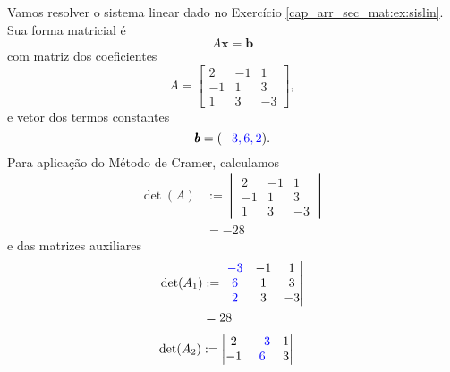 \begin{ex}
  Vamos resolver o sistema linear dado no Exercício \ref{cap_arr_sec_mat:ex:sislin}. Sua forma matricial é
  \begin{equation}
    A\pmb{x} = \pmb{b}
  \end{equation}
  com matriz dos coeficientes
  \begin{equation}
        A =
    \begin{bmatrix}
      2 & -1 & 1\\
      -1 & 1 & 3\\
      1 & 3 & -3
    \end{bmatrix},
  \end{equation}
  e vetor dos termos constantes
  \begin{equation}
    \pmb{b} = ({\color{blue}-3, 6, 2}).
  \end{equation}
  Para aplicação do Método de Cramer, calculamos
  \begin{subequations}
    \begin{align}
      \det(A) &:=
                \begin{vmatrix}
                  2 & -1 & 1\\
                  -1 & 1 & 3\\
                  1 & 3 & -3
                \end{vmatrix}\\
              &= -28
    \end{align}
  \end{subequations}    
  e das matrizes auxiliares
  \begin{subequations}
    \begin{align}
      \det(A_1) &:=
                \begin{vmatrix}
                  {\color{blue}-3} & -1 & 1\\
                  {\color{blue}6} & 1 & 3\\
                  {\color{blue}2} & 3 & -3
                \end{vmatrix}\\
              &= 28
    \end{align}
  \end{subequations}
  \begin{subequations}
    \begin{align}
      \det(A_2) &:=
                \begin{vmatrix}
                  2 & {\color{blue}-3} & 1\\
                  -1 & {\color{blue}6} & 3\\

\end{vmatrix}
\end{align}
\end{subequations}
\end{ex}

